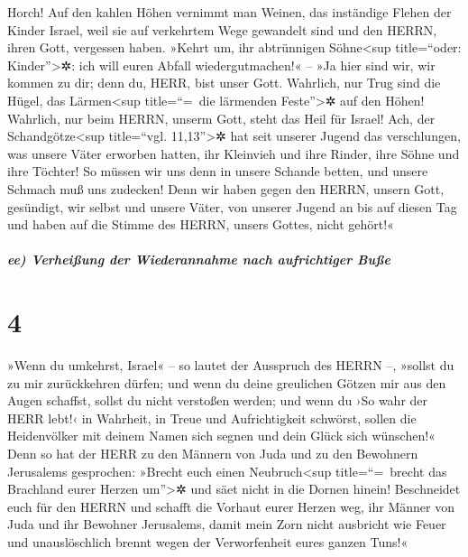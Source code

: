 Horch! Auf den kahlen Höhen vernimmt man Weinen, das
inständige Flehen der Kinder Israel, weil sie auf verkehrtem Wege
gewandelt sind und den HERRN, ihren Gott, vergessen haben.
»Kehrt um, ihr abtrünnigen Söhne\textless sup
title=``oder: Kinder''\textgreater✲: ich will euren Abfall
wiedergutmachen!« -- »Ja hier sind wir, wir kommen zu dir; denn du,
HERR, bist unser Gott. Wahrlich, nur Trug sind die Hügel,
das Lärmen\textless sup title=``=~die lärmenden Feste''\textgreater✲ auf
den Höhen! Wahrlich, nur beim HERRN, unserm Gott, steht das Heil für
Israel! Ach, der Schandgötze\textless sup title=``vgl.
11,13''\textgreater✲ hat seit unserer Jugend das verschlungen, was
unsere Väter erworben hatten, ihr Kleinvieh und ihre Rinder, ihre Söhne
und ihre Töchter! So müssen wir uns denn in unsere
Schande betten, und unsere Schmach muß uns zudecken! Denn wir haben
gegen den HERRN, unsern Gott, gesündigt, wir selbst und unsere Väter,
von unserer Jugend an bis auf diesen Tag und haben auf die Stimme des
HERRN, unsers Gottes, nicht gehört!«

\hypertarget{ee-verheiuxdfung-der-wiederannahme-nach-aufrichtiger-buuxdfe}{%
\subparagraph{ee) Verheißung der Wiederannahme nach aufrichtiger
Buße}\label{ee-verheiuxdfung-der-wiederannahme-nach-aufrichtiger-buuxdfe}}

\hypertarget{section-3}{%
\section{4}\label{section-3}}

»Wenn du umkehrst, Israel« -- so lautet der Ausspruch des
HERRN --, »sollst du zu mir zurückkehren dürfen; und wenn du deine
greulichen Götzen mir aus den Augen schaffst, sollst du nicht verstoßen
werden; und wenn du ›So wahr der HERR lebt!‹ in Wahrheit,
in Treue und Aufrichtigkeit schwörst, sollen die Heidenvölker mit deinem
Namen sich segnen und dein Glück sich wünschen!« Denn so
hat der HERR zu den Männern von Juda und zu den Bewohnern Jerusalems
gesprochen: »Brecht euch einen Neubruch\textless sup title=``=~brecht
das Brachland eurer Herzen um''\textgreater✲ und säet nicht in die
Dornen hinein! Beschneidet euch für den HERRN und schafft
die Vorhaut eurer Herzen weg, ihr Männer von Juda und ihr Bewohner
Jerusalems, damit mein Zorn nicht ausbricht wie Feuer und unauslöschlich
brennt wegen der Verworfenheit eures ganzen Tuns!«

